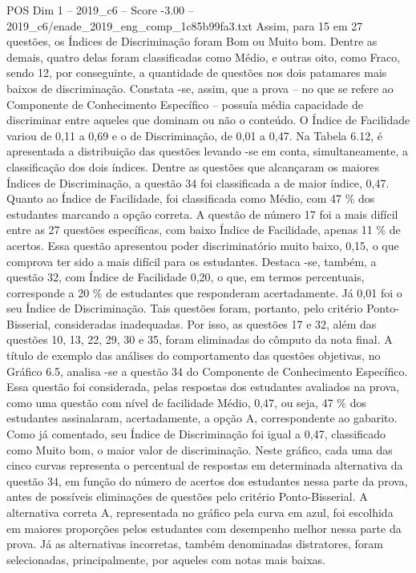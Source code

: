 \begin{textsample}{POS Dim 1 – 2019\_c6 – Score -3.00 – 2019\_c6/enade\_2019\_eng\_comp\_1c85b99fa3.txt}
Assim, para 15 em 27 questões, os Índices de Discriminação foram Bom ou Muito bom.
Dentre as demais, quatro delas foram classificadas como Médio, e outras oito, como Fraco, sendo 12, por conseguinte, a quantidade de questões nos dois patamares mais baixos de discriminação.
Constata -se, assim, que a prova – no que se refere ao Componente de Conhecimento Específico – possuía média capacidade de discriminar entre aqueles que dominam ou não o conteúdo.
O Índice de Facilidade variou de 0,11 a 0,69 e o de Discriminação, de 0,01 a 0,47.
Na Tabela 6.12, é apresentada a distribuição das questões levando -se em conta, simultaneamente, a classificação dos dois índices.
Dentre as questões que alcançaram os maiores Índices de Discriminação, a questão 34 foi classificada a de maior índice, 0,47.
Quanto ao Índice de Facilidade, foi classificada como Médio, com 47 \% dos estudantes marcando a opção correta.
A questão de número 17 foi a mais difícil entre as 27 questões específicas, com baixo Índice de Facilidade, apenas 11 \% de acertos.
Essa questão apresentou poder discriminatório muito baixo, 0,15, o que comprova ter sido a mais difícil para os estudantes.
Destaca -se, também, a questão 32, com Índice de Facilidade 0,20, o que, em termos percentuais, corresponde a 20 \% de estudantes que responderam acertadamente.
Já 0,01 foi o seu Índice de Discriminação.
Tais questões foram, portanto, pelo critério Ponto-Bisserial, consideradas inadequadas.
Por isso, as questões 17 e 32, além das questões 10, 13, 22, 29, 30 e 35, foram eliminadas do cômputo da nota final.
A título de exemplo das análises do comportamento das questões objetivas, no Gráfico 6.5, analisa -se a questão 34 do Componente de Conhecimento Específico.
Essa questão foi considerada, pelas respostas dos estudantes avaliados na prova, como uma questão com nível de facilidade Médio, 0,47, ou seja, 47 \% dos estudantes assinalaram, acertadamente, a opção A, correspondente ao gabarito.
Como já comentado, seu Índice de Discriminação foi igual a 0,47, classificado como Muito bom, o maior valor de discriminação.
Neste gráfico, cada uma das cinco curvas representa o percentual de respostas em determinada alternativa da questão 34, em função do número de acertos dos estudantes nessa parte da prova, antes de possíveis eliminações de questões pelo critério Ponto-Bisserial.
A alternativa correta A, representada no gráfico pela curva em azul, foi escolhida em maiores proporções pelos estudantes com desempenho melhor nessa parte da prova.
Já as alternativas incorretas, também denominadas distratores, foram selecionadas, principalmente, por aqueles com notas mais baixas.

\end{textsample}
